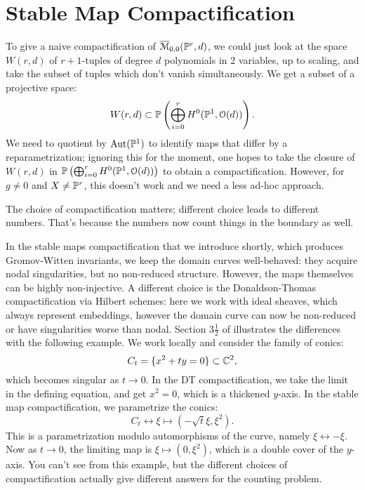 \section{Stable Map Compactification}
\label{sect:stable_map}
To give a naive compactification of
$\overline{\mathcal{M}}_{0,0}(\mathbb P^r,d)$, we could just look at the space $W(r,d)$ of $r+1$-tuples of degree $d$ polynomials
in 2 variables, up to scaling, and take the subset of tuples which don't vanish simultaneously. We get a subset of a projective space:
\[	W(r,d) \subset \mathbb P\left( \bigoplus_{i=0}^r H^0(\mathbb P^1,\mathcal{O}(d)) \right).	\]
We need to quotient by $\operatorname{Aut}(\mathbb P^1)$ to identify maps that differ by a reparametrization; ignoring this for the moment,
one hopes to take the closure of $W(r,d)$ in $\mathbb P\left( \bigoplus_{i=0}^r H^0(\mathbb P^1,\mathcal{O}(d)) \right)$ to obtain
a compactification. However, for $g\neq 0$ and $X \neq \mathbb P^r$, this doesn't work and we need a less ad-hoc approach.

The choice of compactification matters; different choice leads to different numbers. That's
because the numbers now count things in the boundary as well. 

\begin{eg}
In the stable maps compactification that we introduce shortly, which produces Gromov-Witten invariants,
we keep the domain curves well-behaved:
they acquire nodal singularities, but no non-reduced structure. However, the maps themselves can be highly non-injective.
A different choice is the Donaldson-Thomas compactification via Hilbert schemes: here we work with ideal sheaves, which
always represent embeddings, however the domain curve can now be non-reduced or have singularities worse than nodal.
Section $3\frac{1}{2}$ of \cite{PT_counting_curves} illustrates the differences with the following example.
We work locally and consider the family of conics:
\[	C_t = \{ x^2 + ty = 0 \} \subset \mathbb C^2,	\]
which becomes singular as $t\to 0$. In the DT compactification, we take the limit in the defining
equation, and get $x^2 = 0$, which is a thickened $y$-axis. In the stable map compactification, we parametrize
the conics:
\[	C_t \longleftrightarrow \xi \mapsto (-\sqrt{t} \xi, \xi^2) . 	\]
This is a parametrization modulo automorphisms of the curve, namely $\xi \leftrightarrow -\xi$. Now as $t\to 0$,
the limiting map is $\xi \mapsto (0, \xi^2)$, which is a double cover of the $y$-axis.
You can't see from this example, but the different choices of compactification actually give different answers
for the counting problem.
\end{eg}

